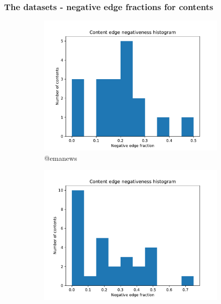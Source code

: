 \documentclass{beamer}
\begin{document}
\begin{frame}[c]
    \frametitle{The datasets - negative edge fractions for contents}
    \begin{figure}
        \begin{center}
            \begin{subfigure}[b]{0.4\textwidth}
                \centering
                \includegraphics[width=\textwidth]{out/emanews200/neg-fraction-content-hist.pdf}
                \caption{@emanews}
                \label{fig:out/emanews200/neg-fraction-content-hist.pdf}
            \end{subfigure}
            \begin{subfigure}[b]{0.4\textwidth}
                \centering
                \includegraphics[width=\textwidth]{out/bbcscience200/neg-fraction-content-hist.pdf}

\end{subfigure}
\end{center}
\end{figure}
\end{frame}
\end{document}
